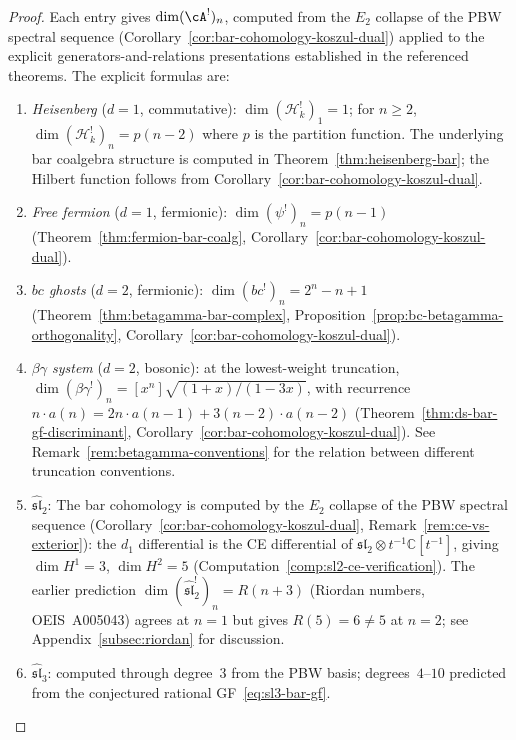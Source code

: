 \begin{proof}
Each entry gives $\dim (\cA^!)_n$, computed from the
$E_2$ collapse of the PBW spectral sequence
(Corollary~\ref{cor:bar-cohomology-koszul-dual}) applied to
the explicit generators-and-relations presentations established
in the referenced theorems.
The explicit formulas are:
\begin{enumerate}
\item \emph{Heisenberg} ($d = 1$, commutative):
  $\dim (\mathcal{H}_k^!)_1 = 1$; for $n \geq 2$,
  $\dim (\mathcal{H}_k^!)_n = p(n-2)$ where $p$ is the partition function.
  The underlying bar coalgebra structure is computed in
  Theorem~\ref{thm:heisenberg-bar}; the Hilbert function follows
  from Corollary~\ref{cor:bar-cohomology-koszul-dual}.
\item \emph{Free fermion} ($d = 1$, fermionic):
  $\dim (\psi^!)_n = p(n-1)$
  (Theorem~\ref{thm:fermion-bar-coalg},
  Corollary~\ref{cor:bar-cohomology-koszul-dual}).
\item \emph{$bc$ ghosts} ($d = 2$, fermionic):
  $\dim (bc^!)_n = 2^n - n + 1$
  (Theorem~\ref{thm:betagamma-bar-complex},
  Proposition~\ref{prop:bc-betagamma-orthogonality},
  Corollary~\ref{cor:bar-cohomology-koszul-dual}).
\item \emph{$\beta\gamma$ system} ($d = 2$, bosonic):
  at the lowest-weight truncation,
  $\dim (\beta\gamma^!)_n = [x^n]\sqrt{(1{+}x)/(1{-}3x)}$,
  with recurrence $n \cdot a(n) = 2n \cdot a(n{-}1) + 3(n{-}2) \cdot a(n{-}2)$
  (Theorem~\ref{thm:ds-bar-gf-discriminant},
  Corollary~\ref{cor:bar-cohomology-koszul-dual}).
  See Remark~\ref{rem:betagamma-conventions}
  for the relation between different truncation conventions.
\item \emph{$\widehat{\mathfrak{sl}}_2$}:
  The bar cohomology is computed by the $E_2$ collapse
  of the PBW spectral sequence
  (Corollary~\ref{cor:bar-cohomology-koszul-dual},
  Remark~\ref{rem:ce-vs-exterior}): the $d_1$
  differential is the CE differential of
  $\mathfrak{sl}_2 \otimes t^{-1}\mathbb{C}[t^{-1}]$,
  giving $\dim H^1 = 3$, $\dim H^2 = 5$
  (Computation~\ref{comp:sl2-ce-verification}).
  The earlier prediction
  $\dim (\widehat{\mathfrak{sl}}_2^!)_n = R(n+3)$
  (Riordan numbers, OEIS~A005043) agrees at $n = 1$
  but gives $R(5) = 6 \neq 5$ at $n = 2$; see
  Appendix~\ref{subsec:riordan} for discussion.
\item \emph{$\widehat{\mathfrak{sl}}_3$}: computed through
  degree~$3$ from the PBW basis;
  degrees~$4$--$10$ predicted from the conjectured
  rational GF~\eqref{eq:sl3-bar-gf}.

\end{enumerate}
\end{proof}

